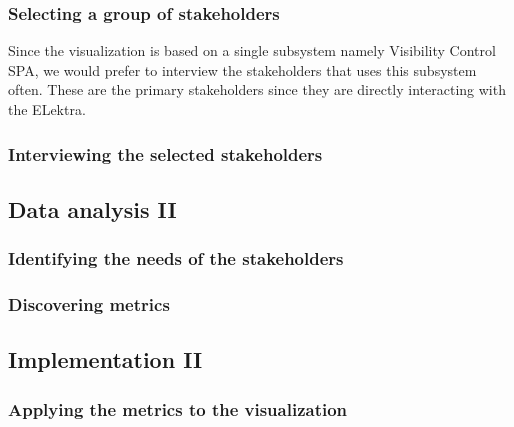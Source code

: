 \subsubsection{Selecting a group of stakeholders}
Since the visualization is based on a single subsystem namely Visibility Control SPA, we would prefer to interview the stakeholders that uses this subsystem often. These are the primary stakeholders since they are directly interacting with the ELektra.

\subsubsection{Interviewing the selected stakeholders}
\todo{[to be filled in]}

\subsection{Data analysis II}

\subsubsection{Identifying the needs of the stakeholders}
\todo{[to be filled in]}

\subsubsection{Discovering metrics}
\todo{[to be filled in]}

\subsection{Implementation II}

\subsubsection{Applying the metrics to the visualization}
\todo{[to be filled in]}
